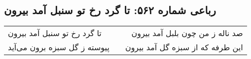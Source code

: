 \begin{center}
\section*{رباعی شماره ۵۶۲: تا گرد رخ تو سنبل آمد بیرون}
\label{sec:sh562}
\begin{longtable}{l p{0.5cm} r}
تا گرد رخ تو سنبل آمد بیرون
&&
صد ناله ز من چون بلبل آمد بیرون
\\
پیوسته ز گل سبزه برون می‌آید
&&
این طرفه که از سبزه گل آمد بیرون
\\
\end{longtable}
\end{center}
